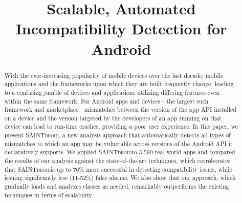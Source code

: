 \documentclass[sigconf]{acmart}
\makeatletter
\def \@approach{\textsc{SAINTdroid}}
\makeatother
\begin{document}
\title{Scalable, Automated Incompatibility Detection for Android} 


\begin{abstract}
With the ever-increasing popularity of mobile devices over
the last decade, mobile applications and the frameworks upon
which they are built frequently change, leading to a
confusing jumble of devices and applications utilizing
differing features even within the same framework. For
Android apps and devices---the largest such framework and
marketplace---mismatches between the version of the app API
installed on a device and the version targeted by the
developers of an app running on that device can lead to
run-time crashes, providing a poor user experience. In this
paper, we present \@approach, a new analysis approach that
automatically detects all types of mismatches to which an
app may be vulnerable across versions of the Android API it
declaratively supports. 
We applied \@approach to 3,590 real-world apps and compared the results of our analysis against the state-of-the-art techniques,
which corroborates that \@approach is up to 76\% more successful in detecting compatibility issues, while issuing significantly less (11-52\%) false alarms.
We also show that our approach, which gradually loads and analyzes classes as needed, remarkably outperforms the existing techniques in terms of scalability.

\end{abstract}


\maketitle











%
\balance


\end{document}
